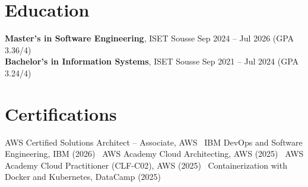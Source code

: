 \documentclass[a4paper,10pt]{article}
\begin{document}
\section*{Education}
\textbf{Master's in Software Engineering}, ISET Sousse \hfill Sep 2024 -- Jul 2026 (GPA 3.36/4)\\
\textbf{Bachelor's in Information Systems}, ISET Sousse \hfill Sep 2021 -- Jul 2024 (GPA 3.24/4)

\section*{Certifications}
AWS Certified Solutions Architect -- Associate, AWS \textbar\ IBM DevOps and Software Engineering, IBM (2026) \textbar\ AWS Academy Cloud Architecting, AWS (2025) \textbar\ AWS Academy Cloud Practitioner (CLF-C02), AWS (2025) \textbar\ Containerization with Docker and Kubernetes, DataCamp (2025)
\end{document}
